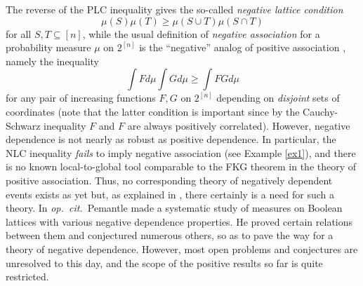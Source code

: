 \documentclass[10pt,reqno]{amsart}
\theoremstyle{plain}
\theoremstyle{definition}
\theoremstyle{remark}
\begin{document}
The reverse of the PLC inequality gives the so-called
{\em negative lattice condition} 
\begin{equation*}
\mu(S)\mu(T) \geq \mu(S\cup T)\mu(S\cap T)\tag*{(NLC)}
\end{equation*}
for all $S,T \subseteq [n]$, while the usual 
definition of {\em negative association} for a probability 
measure $\mu$ on $2^{[n]}$ is the ``negative'' analog of positive 
association \cite{P}, namely the inequality
$$
\int Fd\mu \int Gd\mu \ge \int FG d\mu
$$
for any pair of increasing functions $F,G$ on $2^{[n]}$ depending on 
{\em disjoint} sets of coordinates (note that the latter condition is 
important since by the Cauchy-Schwarz inequality $F$ and $F$ are always
positively correlated).
However, negative 
dependence is not nearly as robust as positive dependence. In particular,
the NLC inequality 
{\em fails} to imply negative association 
(see Example \ref{ex1}), and there is
no known local-to-global tool comparable to the FKG theorem in the
theory of positive association. Thus, no corresponding theory
of negatively dependent events exists as yet but, as explained in \cite{P},
there certainly is a need for such a theory. 
In {\em op.~cit.~}Pemantle made a systematic
study of measures on Boolean lattices with various negative dependence
properties. He proved certain relations between them and conjectured numerous 
others, so as to pave the way for a theory of negative dependence. 
However, most open problems and conjectures are unresolved to this day, and 
the scope of the positive results so far is quite restricted.
\end{document}

